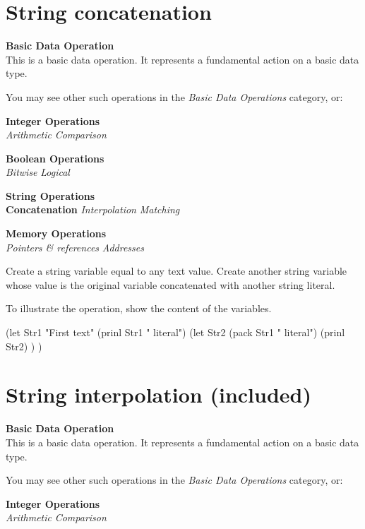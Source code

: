 \pagebreak{}
\section*{String concatenation}

\textbf{Basic Data Operation}\\ This is a basic data operation. It
represents a fundamental action on a basic data type.

You may see other such operations in the
\emph{Basic Data Operations}
category, or:

\textbf{Integer Operations} \\
\emph{Arithmetic} \textbar{}
\emph{Comparison}

\textbf{Boolean Operations} \\ \emph{Bitwise}
\textbar{} \emph{Logical}

\textbf{String Operations} \\ \textbf{Concatenation} \textbar{}
\emph{Interpolation} \textbar{}
\emph{Matching}

\textbf{Memory Operations} \\
\emph{Pointers \& references}
\textbar{} \emph{Addresses}

Create a string variable equal to any text value. Create another string
variable whose value is the original variable concatenated with another
string literal.

To illustrate the operation, show the content of the variables.

\begin{wideverbatim}

(let Str1 "First text"
   (prinl Str1 " literal")
   (let Str2 (pack Str1 " literal")
      (prinl Str2) ) )

\end{wideverbatim}

\pagebreak{}
\section*{String interpolation (included)}


\textbf{Basic Data Operation}\\ This is a basic data operation. It
represents a fundamental action on a basic data type.

You may see other such operations in the
\emph{Basic Data Operations}
category, or:

\textbf{Integer Operations} \\
\emph{Arithmetic} \textbar{}
\emph{Comparison}


